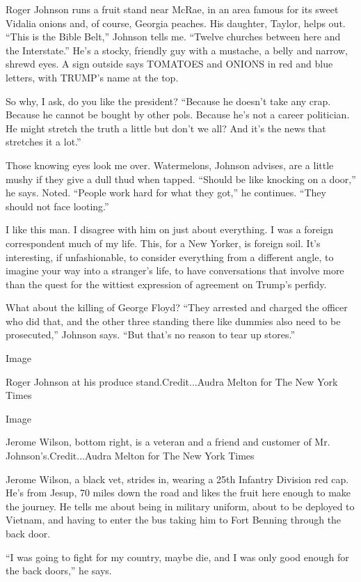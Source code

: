 Roger Johnson runs a fruit stand near McRae, in an area famous for its
sweet Vidalia onions and, of course, Georgia peaches. His daughter,
Taylor, helps out. ``This is the Bible Belt,'' Johnson tells me.
``Twelve churches between here and the Interstate.'' He's a stocky,
friendly guy with a mustache, a belly and narrow, shrewd eyes. A sign
outside says TOMATOES and ONIONS in red and blue letters, with TRUMP's
name at the top.

So why, I ask, do you like the president? ``Because he doesn't take any
crap. Because he cannot be bought by other pols. Because he's not a
career politician. He might stretch the truth a little but don't we all?
And it's the news that stretches it a lot.''

Those knowing eyes look me over. Watermelons, Johnson advises, are a
little mushy if they give a dull thud when tapped. ``Should be like
knocking on a door,'' he says. Noted. ``People work hard for what they
got,'' he continues. ``They should not face looting.''

I like this man. I disagree with him on just about everything. I was a
foreign correspondent much of my life. This, for a New Yorker, is
foreign soil. It's interesting, if unfashionable, to consider everything
from a different angle, to imagine your way into a stranger's life, to
have conversations that involve more than the quest for the wittiest
expression of agreement on Trump's perfidy.

What about the killing of George Floyd? ``They arrested and charged the
officer who did that, and the other three standing there like dummies
also need to be prosecuted,'' Johnson says. ``But that's no reason to
tear up stores.''

Image

Roger Johnson at his produce stand.Credit...Audra Melton for The New
York Times

Image

Jerome Wilson, bottom right, is a veteran and a friend and customer of
Mr. Johnson's.Credit...Audra Melton for The New York Times

Jerome Wilson, a black vet, strides in, wearing a 25th Infantry Division
red cap. He's from Jesup, 70 miles down the road and likes the fruit
here enough to make the journey. He tells me about being in military
uniform, about to be deployed to Vietnam, and having to enter the bus
taking him to Fort Benning through the back door.

``I was going to fight for my country, maybe die, and I was only good
enough for the back doors,'' he says.


